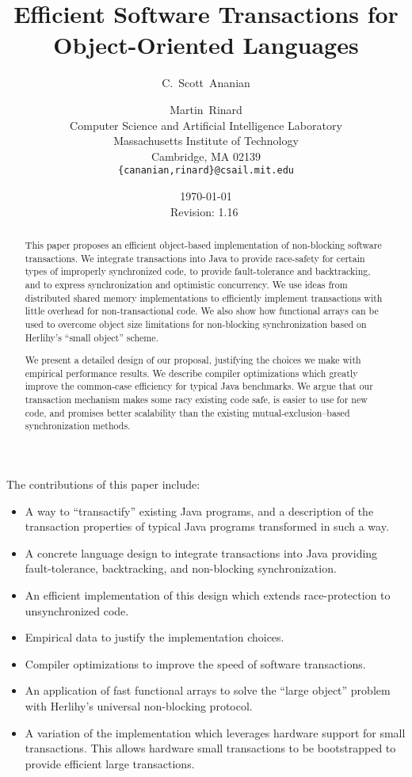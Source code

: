 \documentclass[preprint]{rdbacmconf}
\title{Efficient Software Transactions for Object-Oriented Languages}
\author{C.~Scott~Ananian \and Martin~Rinard \\
Computer Science and Artificial Intelligence Laboratory\\
Massachusetts Institute of Technology\\ 
Cambridge, MA 02139 \\
\texttt{\{cananian,rinard\}@csail.mit.edu}
}
\date{\today \\ $ $Revision: 1.16 $ $}
\begin{document}
%
\maketitle
{}
%
\begin{abstract}
This paper proposes an efficient object-based implementation of
non-blocking software transactions.  We integrate transactions into Java
to provide race-safety for certain types of improperly synchronized
code, to provide fault-tolerance and backtracking, and to express
synchronization and optimistic concurrency.  We use ideas from
distributed shared memory implementations to efficiently implement
transactions with little overhead for non-transactional code.  We also
show how functional arrays can be used to overcome object size
limitations for non-blocking synchronization based on Herlihy's
``small object'' scheme.

We present a detailed design of our proposal, justifying the choices
we make with empirical performance results.  We describe compiler
optimizations which greatly improve the common-case efficiency for
typical Java benchmarks.  We argue that our transaction mechanism
makes some racy existing code safe, is easier to use for new code,
and promises better scalability than the existing
mutual-exclusion--based synchronization methods.
\end{abstract}

%

The contributions of this paper include:
\begin{itemize}
\item A way to ``transactify'' existing Java programs, and a
  description of the transaction properties of typical Java programs
  transformed in such a way.
\item A concrete language design to integrate transactions into Java
  providing fault-tolerance, backtracking, and non-blocking
  synchronization.
\item An efficient implementation of this design which extends
  race-protection to unsynchronized code.
\item Empirical data to justify the implementation choices.
\item Compiler optimizations to improve the speed of software
  transactions.
\item An application of fast functional arrays to solve the ``large
  object'' problem with Herlihy's universal non-blocking protocol.
\item A variation of the implementation which leverages hardware
  support for small transactions.  This allows hardware small
  transactions to be bootstrapped to provide efficient large
  transactions.
\end{itemize}
\end{document}
